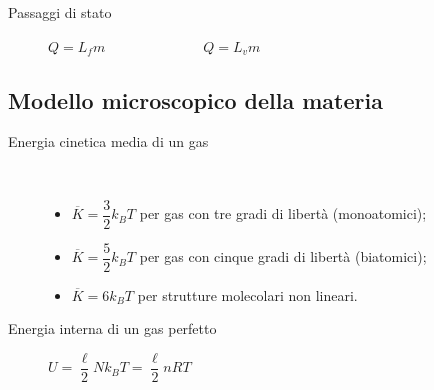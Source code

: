 \documentclass[a4paper,11pt,italian]{article}
\begin{document}
\begin{description}
  
  \item[Passaggi di stato] 
  $ Q = L_f m $~~~~~~~~~~~~~~$ Q = L_v m $
\end{description}

\subsection{Modello microscopico della materia}
\begin{description}
  \item[Energia cinetica media di un gas] ~
  \begin{itemize}
    \item $ \overline{K} = \dfrac{3}{2}k_B T $ per gas con tre gradi di libertà (monoatomici);
    \item $ \overline{K} = \dfrac{5}{2}k_B T $ per gas con cinque gradi di libertà (biatomici);
    \item $ \overline{K} = 6 k_B T $ per strutture molecolari non lineari.
  \end{itemize}

%   
  
  \item[Energia interna di un gas perfetto] 
  $ U = \dfrac{\ell}{2} N k_B T = \dfrac{\ell}{2} n R T  $
\end{description}
\end{document}
